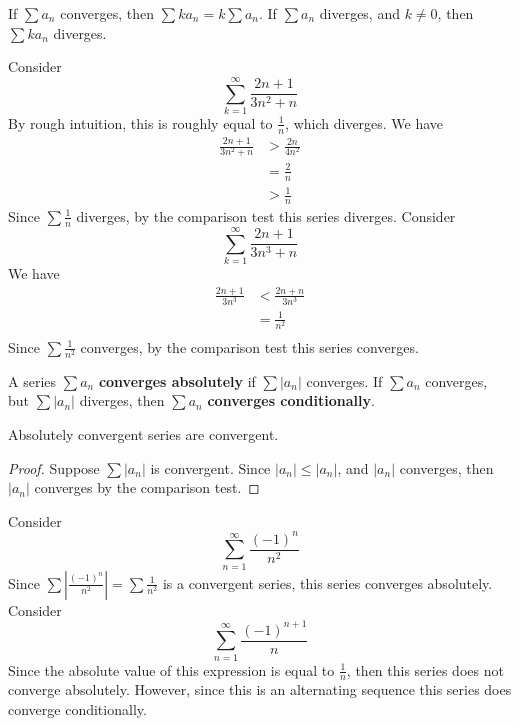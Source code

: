 \documentclass{article}
\begin{document}
\begin{proposition}
If $\sum a_n$ converges, then $\sum ka_n = k \sum a_n$. \newline
If $\sum a_n$ diverges, and $k \not = 0$, then $\sum ka_n$ diverges.
\end{proposition}

\begin{examples}
Consider \[\sum_{k=1}^\infty \frac{2n+1}{3n^2 + n}\]
By rough intuition, this is roughly equal to $\frac{1}{n}$, which diverges.
We have
\begin{align*}
    \frac{2n+1}{3n^2+n} &> \frac{2n}{4n^2}\\
    &= \frac{2}{n}\\
    &> \frac{1}{n}
\end{align*}
Since $\sum \frac{1}{n}$ diverges, by the comparison test this series diverges.
\newline
Consider \[\sum_{k=1}^\infty \frac{2n+1}{3n^3 + n}\]
We have\
\begin{align*}
    \frac{2n+1}{3n^3} &< \frac{2n+n}{3n^3}\\
    &= \frac{1}{n^2}\\
\end{align*}
Since $\sum\frac{1}{n^2}$ converges, by the comparison test this series converges.
\end{examples}
\begin{definition}
A series $\sum a_n$ \textbf{converges absolutely} if $\sum |a_n|$ converges.
If $\sum a_n$ converges, but $\sum |a_n|$ diverges, then $\sum a_n$ \textbf{converges conditionally}.
\end{definition}
\begin{cthm}[Theorem 14.7]
Absolutely convergent series are convergent.
\end{cthm}
\begin{proof}
Suppose $\sum |a_n|$ is convergent. Since $|a_n| \leq |a_n|$, and $|a_n|$ converges, then $|a_n|$ converges by the comparison test.
\end{proof}
\begin{examples}
Consider \[\sum_{n=1}^\infty \frac{(-1)^n}{n^2}\] Since $\sum \left| \frac{(-1)^n}{n^2} \right| = \sum \frac{1}{n^2}$ is a convergent series, this series converges absolutely.
\newline
Consider \[\sum_{n=1}^\infty \frac{(-1)^{n+1}}{n}\]
Since the absolute value of this expression is equal to $\frac{1}{n}$, then this series does not converge absolutely. However, since this is an alternating sequence this series does converge conditionally.
\end{examples}
\end{document}
